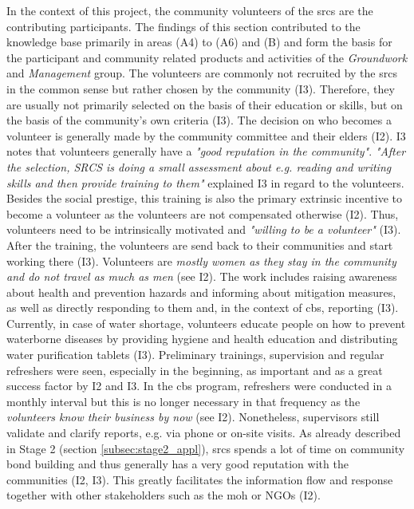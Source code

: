 In the context of this project, the community volunteers of the \acrshort{srcs} are the contributing participants. The findings of this section contributed to the knowledge base primarily in areas (A4) to (A6) and (B) and form the basis for the participant and community related products and activities of the \textit{Groundwork} and \textit{Management} group. The volunteers are commonly not recruited by the \acrshort{srcs} in the common sense but rather chosen by the community (I3). Therefore, they are usually not primarily selected on the basis of their education or skills, but on the basis of the community's own criteria (I3). The decision on who becomes a volunteer is generally made by the community committee and their elders (I2). I3 notes that volunteers generally have a \textit{"good reputation in the community"}. \textit{"After the selection, SRCS is doing a small assessment about e.g. reading and writing skills and then provide training to them"} explained I3 in regard to the volunteers. Besides the social prestige, this training is also the primary extrinsic incentive to become a volunteer as the volunteers are not compensated otherwise (I2). Thus, volunteers need to be intrinsically motivated and \textit{"willing to be a volunteer"} (I3). After the training, the volunteers are send back to their communities and start working there (I3). Volunteers are \textit{mostly women as they stay in the community and do not travel as much as men} (see I2). The work includes raising awareness about health and prevention hazards and informing about mitigation measures, as well as directly responding to them and, in the context of \acrshort{cbs}, reporting (I3). Currently, in case of water shortage, volunteers educate people on how to prevent waterborne diseases by providing hygiene and health education and distributing water purification tablets (I3).\newline
Preliminary trainings, supervision and regular refreshers were seen, especially in the beginning, as important and as a great success factor by I2 and I3. In the \acrshort{cbs} program, refreshers were conducted in a monthly interval but this is no longer necessary in that frequency as the \textit{volunteers know their business by now} (see I2). Nonetheless, supervisors still validate and clarify reports, e.g. via phone or on-site visits. As already described in Stage 2 (section \ref{subsec:stage2_appl}), \acrshort{srcs} spends a lot of time on community bond building and thus generally has a very good reputation with the communities (I2, I3). This greatly facilitates the information flow and response together with other stakeholders such as the \acrshort{moh} or NGOs (I2).\newline
